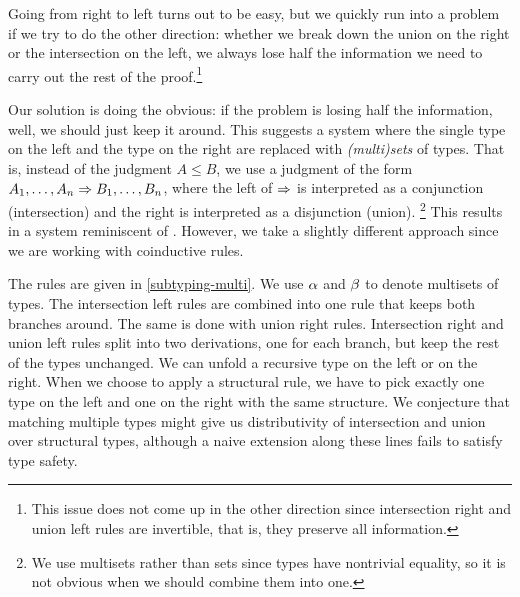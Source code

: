 \documentclass[submission,copyright,creativecommons]{eptcs}
\begin{document}
Going from right to left turns out to be easy, but we quickly run into a problem if we try to do the other direction: whether we break down the union on the right or the intersection on the left, we always lose half the information we need to carry out the rest of the proof.\footnote{This issue does not come up in the other direction since intersection right and union left rules are invertible, that is, they preserve all information.}

Our solution is doing the obvious: if the problem is losing half the information, well, we should just keep it around. This suggests a system where the single type on the left and the type on the right are replaced with \emph{(multi)sets} of types. That is, instead of the judgment $A \le B$, we use a judgment of the form $A_1, \ldots, A_n \Rightarrow B_1, \ldots, B_n$, where the left of $\Rightarrow$ is interpreted as a conjunction (intersection) and the right is interpreted as a disjunction (union).%
\footnote{We use multisets rather than sets since types have nontrivial equality, so it is not obvious when we should combine them into one.
}
This results in a system reminiscent of \cite{Gentzen35, Girard87}. However, we take a slightly different approach since we are working with coinductive rules.

The rules are given in \cref{subtyping-multi}. We use $\alpha$ and $\beta$ to denote multisets of types. The intersection left rules are combined into one rule that keeps both branches around. The same is done with union right rules. Intersection right and union left rules split into two derivations, one for each branch, but keep the rest of the types unchanged. We can unfold a recursive type on the left or on the right. When we choose to apply a structural rule, we have to pick exactly one type on the left and one on the right with the same structure. We conjecture that matching multiple types might give us distributivity of intersection and union over structural types, although a naive extension along these lines fails to satisfy type safety.
\end{document}
